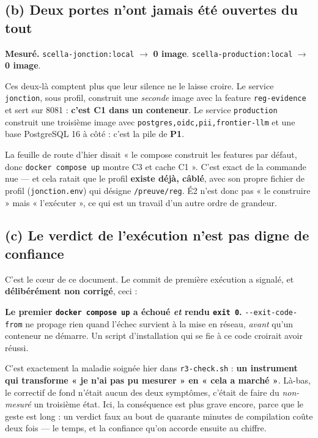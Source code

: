 \documentclass[11pt]{article}
\newcommand{\code}[1]{\texttt{\small #1}}
\newcommand{\pire}[1]{{\color{efered}\textbf{#1}}}
\newcommand{\mm}[1]{\textbf{#1}}
\newcommand{\mesure}[1]{{\color{efeteal}\textbf{Mesuré.} }#1\par}
\newcommand{\fl}{$\rightarrow$}
\begin{document}
\subsection{(b) Deux portes n'ont jamais été ouvertes du tout}
\mesure{\code{scella-jonction:local} \fl{} \pire{0 image}. \code{scella-production:local} \fl{}
\pire{0 image}.}

Ces deux-là comptent plus que leur silence ne le laisse croire. Le service \code{jonction}, sous
profil, construit une \emph{seconde} image avec la feature \code{reg-evidence} et sert sur 8081 :
\textbf{c'est C1 dans un conteneur}. Le service \code{production} construit une troisième image avec
\code{postgres,oidc,pii,frontier-llm} et une base PostgreSQL 16 à côté : c'est la pile de \mm{P1}.

La feuille de route d'hier disait « le compose construit les features par défaut, donc
\code{docker compose up} montre C3 et cache C1 ». C'est exact de la commande nue --- et cela ratait
que le profil \textbf{existe déjà, câblé}, avec son propre fichier de profil (\code{jonction.env})
qui désigne \code{/preuve/reg}. \mbox{É2} n'est donc pas « le construire » mais « l'exécuter », ce
qui est un travail d'un autre ordre de grandeur.

\subsection{(c) Le verdict de l'exécution n'est pas digne de confiance}
C'est le cœur de ce document. Le commit de première exécution a signalé, et \textbf{délibérément non
corrigé}, ceci :

\begin{cadre}
\textbf{Le premier \code{docker compose up} a échoué \emph{et} rendu \code{exit 0}.}
\code{-{}-exit-code-from} ne propage rien quand l'échec survient à la mise en réseau, \emph{avant}
qu'un conteneur ne démarre. Un script d'installation qui se fie à ce code croirait avoir réussi.
\end{cadre}

C'est exactement la maladie soignée hier dans \code{r3-check.sh} : \textbf{un instrument qui
transforme « je n'ai pas pu mesurer » en « cela a marché »}. Là-bas, le correctif de fond n'était
aucun des deux symptômes, c'était de faire du \emph{non-mesuré} un troisième état. Ici, la
conséquence est plus grave encore, parce que le geste est long : un verdict faux au bout de
quarante minutes de compilation coûte deux fois --- le temps, et la confiance qu'on accorde ensuite
au chiffre.
\end{document}

